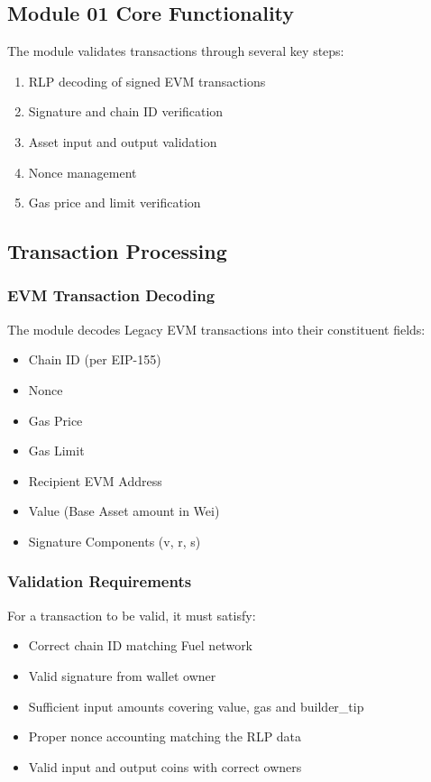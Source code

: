 \subsection{Module 01 Core Functionality}
The module validates transactions through several key steps:
\begin{enumerate}
    \item RLP decoding of signed EVM transactions
    \item Signature and chain ID verification
    \item Asset input and output validation
    \item Nonce management
    \item Gas price and limit verification
\end{enumerate}

\subsection{Transaction Processing}
\subsubsection{EVM Transaction Decoding}
The module decodes Legacy EVM transactions into their constituent fields:
\begin{itemize}
    \item Chain ID (per EIP-155)
    \item Nonce
    \item Gas Price
    \item Gas Limit
    \item Recipient EVM Address
    \item Value (Base Asset amount in Wei)
    \item Signature Components (v, r, s)
\end{itemize}

\subsubsection{Validation Requirements}
For a transaction to be valid, it must satisfy:
\begin{itemize}
    \item Correct chain ID matching Fuel network
    \item Valid signature from wallet owner
    \item Sufficient input amounts covering value, gas and builder\_tip
    \item Proper nonce accounting matching the RLP data
    \item Valid input and output coins with correct owners
\end{itemize}




